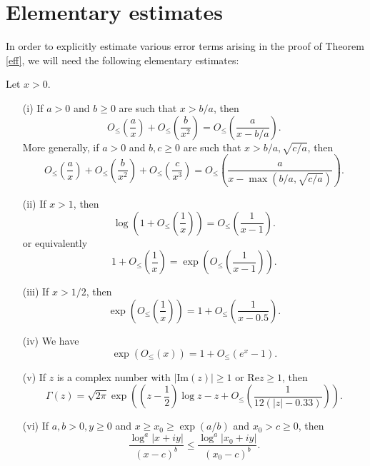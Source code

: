 \section{Elementary estimates}

In order to explicitly estimate various error terms arising in the proof of Theorem \ref{eff}, we will need the following elementary estimates:

\begin{lemma}\label{elem-lem} Let $x > 0$.
\begin{itemize}
\item[(i)] If $a > 0$ and $b \geq 0$ are such that $x > b/a$, then
$$O_{\leq}\left(\frac{a}{x}\right) + O_{\leq}\left( \frac{b}{x^2}\right ) = O_{\leq}\left( \frac{a}{x-b/a} \right).$$
More generally, if $a > 0$ and $b,c \geq 0$ are such that $x > b/a, \sqrt{c/a}$, then
$$O_{\leq}\left(\frac{a}{x}\right) + O_{\leq}\left( \frac{b}{x^2} \right) + O_{\leq}\left( \frac{c}{x^3}\right) = O_{\leq}\left( \frac{a}{x-\max(b/a,\sqrt{c/a})} \right).$$
\item[(ii)]  If $x > 1$, then
$$\log\left(1 + O_{\leq}\left(\frac{1}{x}\right) \right) = O_{\leq}\left(\frac{1}{x-1}\right).$$
or equivalently
$$1 + O_{\leq}\left(\frac{1}{x}\right) = \exp\left( O_{\leq}\left(\frac{1}{x-1}\right) \right).$$
\item[(iii)]  If $x > 1/2$, then
$$\exp\left( O_{\leq}\left(\frac{1}{x}\right) \right) = 1 + O_{\leq}\left( \frac{1}{x-0.5} \right).$$
\item[(iv)]  We have
$$ \exp\left(O_{\leq}(x)\right) = 1 + O_{\leq}(e^x-1).$$
\item[(v)] If $z$ is a complex number with $|\mathrm{Im}(z)| \geq 1$ or $\mathrm{Re} z \geq 1$, then
$$ \Gamma(z) = \sqrt{2\pi} \exp\left( \left(z-\frac{1}{2}\right) \log z - z + O_{\leq}\left( \frac{1}{12(|z| - 0.33)} \right)\right).$$
\item[(vi)] If $a,b > 0, y \geq 0$ and $x \geq x_0 \geq \exp(a/b)$ and $x_0 > c \geq 0$, then
$$\frac{\log^a|x+iy|}{(x-c)^b} \leq \frac{\log^a |x_0+iy|}{(x_0-c)^b}.$$
\end{itemize}
\end{lemma}

